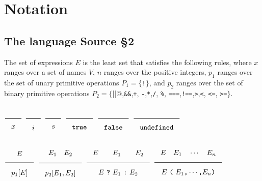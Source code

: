 

\newcommand{\Rule}[2]{\genfrac{}{}{0.7pt}{}{{\setlength{\fboxrule}{0pt}\setlength{\fboxsep}{3mm}\fbox{$#1$}}}{{\setlength{\fboxrule}{0pt}\setlength{\fboxsep}{3mm}\fbox{$#2$}}}}

\newcommand{\TruE}{\textbf{\texttt{true}}}
\newcommand{\FalsE}{\textbf{\texttt{false}}}
\newcommand{\Rc}{\texttt{\}}}
\newcommand{\Lc}{\texttt{\{}}
\newcommand{\Rp}{\texttt{)}}
\newcommand{\Lp}{\texttt{(}}
\newcommand{\Fun}{\textbf{\texttt{function}}}
\newcommand{\Let}{\textbf{\texttt{let}}}
\newcommand{\Return}{\textbf{\texttt{return}}}
\newcommand{\Const}{\textbf{\texttt{const}}}
\newcommand{\If}{\textbf{\texttt{if}}}
\newcommand{\Else}{\textbf{\texttt{else}}}
\newcommand{\Bool}{\texttt{bool}}
\newcommand{\Number}{\texttt{number}}
\newcommand{\String}{\texttt{string}}
\newcommand{\Undefined}{\texttt{undefined}}

\newtheorem{definition}{Definition}[section]




\section{Notation}  

\subsection{The language Source \S2}

The set of expressions $E$ is the least set that satisfies the following rules, 
where $x$ ranges over a set of names $V$, $n$ ranges over the positive integers, 
$p_1$ ranges over the set of unary primitive operations 
$P_1 = \{$\verb#!#$\}$, and $p_2$ ranges over the set of binary 
primitive operations
$P_2 = \{$\verb@||@,\verb#&&#,\verb#+#,
\verb#-#,\verb#*#,\verb#/#, \verb#%#, \verb#===#,\verb#!==#,\verb#>#,\verb#<#, \verb#<=#, \verb#>=#$\}$.

$\Rule{}{x}$
\hfill 
$\Rule{}{i}$
\hfill 
$\Rule{}{s}$
\hfill 
$\Rule{}{\TruE}$
\hfill 
$\Rule{}{\FalsE}$
\hfill 
$\Rule{}{\Undefined}$

$\Rule{E}{p_1[E]}$
\hfill
$\Rule{E_1\quad E_2}{p_2[E_1, E_2]}$
\hfill
$\Rule{E \qquad E_1 \qquad E_2}{E\ \texttt{?}\ E_1\ \texttt{:}\ E_2}$
\hfill
$\Rule{E\quad E_1\quad \cdots \quad E_n}{E\ \Lp\ E_1\texttt{,}\cdots\texttt{,} E_n\Rp}$

